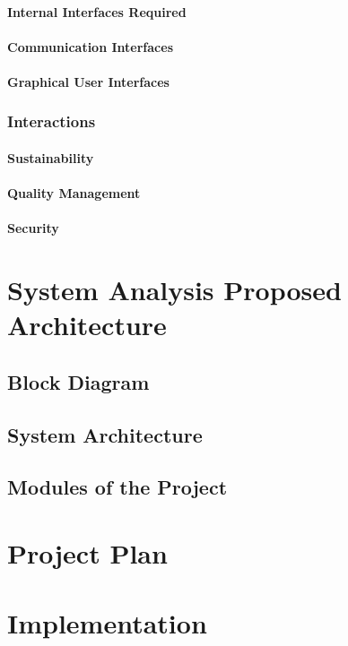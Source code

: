 \documentclass[openany]{report}
\begin{document}
\subsubsection{Internal Interfaces Required}
\subsubsection{Communication Interfaces}
\subsubsection{Graphical User Interfaces}

\subsection{Interactions}
\subsubsection{Sustainability}
\subsubsection{Quality Management}
\subsubsection{Security}

\chapter{System Analysis Proposed Architecture}

\section{Block Diagram}
\section{System Architecture}
\section{Modules of the Project}

\chapter{Project Plan}

\chapter{Implementation}
\end{document}
